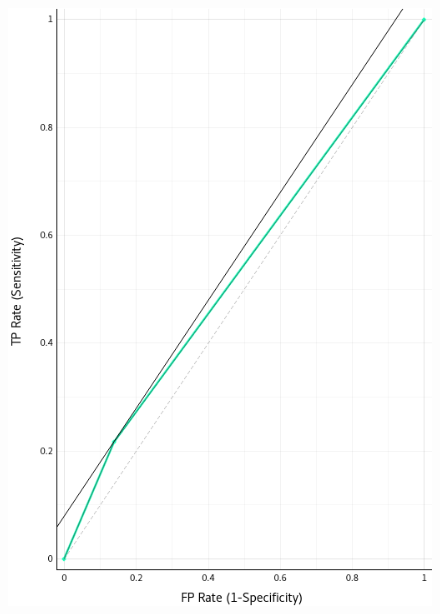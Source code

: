 \begin{figure}[H]
\begin{center}
    \includegraphics{figuras/roc_1-5.png}
\end{center}
\caption{}
\label{fig:class_1.50}
\end{figure}


